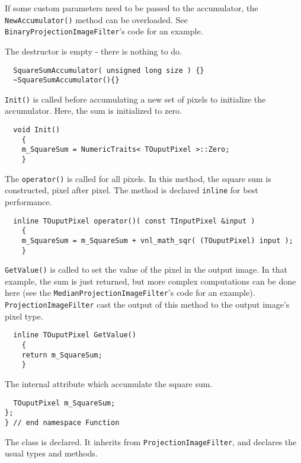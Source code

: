 \documentclass{InsightArticle}
\begin{document}
If some custom parameters need to be passed to the accumulator, the \verb$NewAccumulator()$
method can be overloaded. See \verb$BinaryProjectionImageFilter$'s code for an
example.

The destructor is empty - there is nothing to do.
\small \begin{verbatim}
  SquareSumAccumulator( unsigned long size ) {}
  ~SquareSumAccumulator(){}
\end{verbatim} \normalsize
\verb$Init()$ is called before accumulating a new set of pixels
to initialize the accumulator. Here, the sum is initialized to zero.
\small \begin{verbatim}
  void Init()
    {
    m_SquareSum = NumericTraits< TOuputPixel >::Zero;
    }
\end{verbatim} \normalsize
The \verb$operator()$ is called for all pixels. In this method, the square sum is
constructed, pixel after pixel. The method is declared \verb$inline$ for best
performance.
\small \begin{verbatim}
  inline TOuputPixel operator()( const TInputPixel &input )
    {
    m_SquareSum = m_SquareSum + vnl_math_sqr( (TOuputPixel) input );
    }
\end{verbatim} \normalsize
\verb$GetValue()$ is called to set the value of the pixel in the output image. In that example, the
sum is just returned, but more complex computations can be done here (see the
\verb$MedianProjectionImageFilter$'s code for an example). \verb$ProjectionImageFilter$ cast the
output of this method to the output image's pixel type.
\small \begin{verbatim}
  inline TOuputPixel GetValue()
    {
    return m_SquareSum;
    }
\end{verbatim} \normalsize
The internal attribute which accumulate the square sum.
\small \begin{verbatim}
  TOuputPixel m_SquareSum;
};
} // end namespace Function
\end{verbatim} \normalsize
The class is declared. It inherits from \verb$ProjectionImageFilter$, and declares the
usual types and methods.
\end{document}
